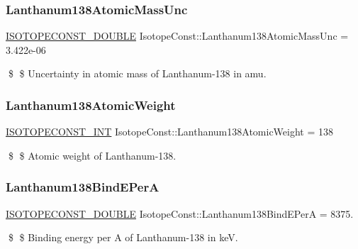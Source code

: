 \subsubsection{\texorpdfstring{Lanthanum138\+Atomic\+Mass\+Unc}{Lanthanum138AtomicMassUnc}}
{\footnotesize\ttfamily \mbox{\hyperlink{group___isotope_const-_macros_ga8f45a7272ce02c0b4c65c44636ed719a}{I\+S\+O\+T\+O\+P\+E\+C\+O\+N\+S\+T\+\_\+\+D\+O\+U\+B\+LE}} Isotope\+Const\+::\+Lanthanum138\+Atomic\+Mass\+Unc = 3.\+422e-\/06}

\$ \$ Uncertainty in atomic mass of Lanthanum-\/138 in amu. \mbox{\label{group___isotope_const-_lanthanum-_la138_ga8363591938dfe0b6f43c17dceb32dbc7}} 
\subsubsection{\texorpdfstring{Lanthanum138\+Atomic\+Weight}{Lanthanum138AtomicWeight}}
{\footnotesize\ttfamily \mbox{\hyperlink{group___isotope_const-_macros_ga5f18360b3e99483a35c32d789e62621c}{I\+S\+O\+T\+O\+P\+E\+C\+O\+N\+S\+T\+\_\+\+I\+NT}} Isotope\+Const\+::\+Lanthanum138\+Atomic\+Weight = 138}

\$ \$ Atomic weight of Lanthanum-\/138. \mbox{\label{group___isotope_const-_lanthanum-_la138_gae9806f1094da8b00cb8bf6e2cf27a16b}} 
\subsubsection{\texorpdfstring{Lanthanum138\+Bind\+E\+PerA}{Lanthanum138BindEPerA}}
{\footnotesize\ttfamily \mbox{\hyperlink{group___isotope_const-_macros_ga8f45a7272ce02c0b4c65c44636ed719a}{I\+S\+O\+T\+O\+P\+E\+C\+O\+N\+S\+T\+\_\+\+D\+O\+U\+B\+LE}} Isotope\+Const\+::\+Lanthanum138\+Bind\+E\+PerA = 8375.}

\$ \$ Binding energy per A of Lanthanum-\/138 in keV. \mbox{\label{group___isotope_const-_lanthanum-_la138_ga9a2b8eac94e512a227010c66140bd3e7}} 

